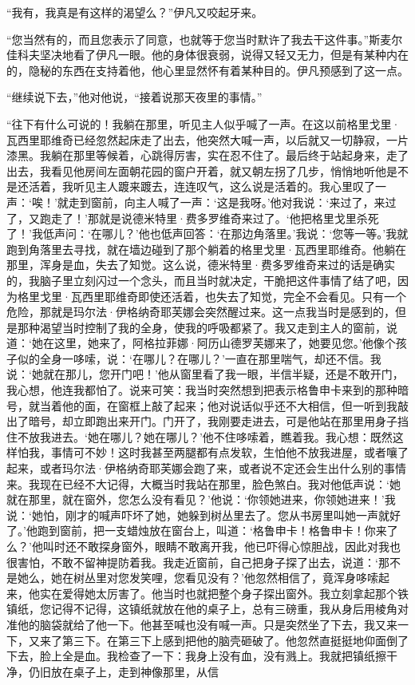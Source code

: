 \par “我有，我真是有这样的渴望么？”伊凡又咬起牙来。
\par “您当然有的，而且您表示了同意，也就等于您当时默许了我去干这件事。”斯麦尔佳科夫坚决地看了伊凡一眼。他的身体很衰弱，说得又轻又无力，但是有某种内在的，隐秘的东西在支持着他，他心里显然怀有着某种目的。伊凡预感到了这一点。
\par “继续说下去，”他对他说，“接着说那天夜里的事情。”
\par “往下有什么可说的！我躺在那里，听见主人似乎喊了一声。在这以前格里戈里·瓦西里耶维奇已经忽然起床走了出去，他突然大喊一声，以后就又一切静寂，一片漆黑。我躺在那里等候着，心跳得厉害，实在忍不住了。最后终于站起身来，走了出去，我看见他房间左面朝花园的窗户开着，就又朝左拐了几步，悄悄地听他是不是还活着，我听见主人踱来踱去，连连叹气，这么说是活着的。我心里叹了一声：‘唉！’就走到窗前，向主人喊了一声：‘这是我呀。’他对我说：‘来过了，来过了，又跑走了！’那就是说德米特里·费多罗维奇来过了。‘他把格里戈里杀死了！’我低声问：‘在哪儿？’他也低声回答：‘在那边角落里。’我说：‘您等一等。’我就跑到角落里去寻找，就在墙边碰到了那个躺着的格里戈里·瓦西里耶维奇。他躺在那里，浑身是血，失去了知觉。这么说，德米特里·费多罗维奇来过的话是确实的，我脑子里立刻闪过一个念头，而且当时就决定，干脆把这件事情了结了吧，因为格里戈里·瓦西里耶维奇即使还活着，也失去了知觉，完全不会看见。只有一个危险，那就是玛尔法·伊格纳奇耶芙娜会突然醒过来。这一点我当时是感到的，但是那种渴望当时控制了我的全身，使我的呼吸都紧了。我又走到主人的窗前，说道：‘她在这里，她来了，阿格拉菲娜·阿历山德罗芙娜来了，她要见您。’他像个孩子似的全身一哆嗦，说：‘在哪儿？在哪儿？’一直在那里喘气，却还不信。我说：‘她就在那儿，您开门吧！’他从窗里看了我一眼，半信半疑，还是不敢开门，我心想，他连我都怕了。说来可笑：我当时突然想到把表示格鲁申卡来到的那种暗号，就当着他的面，在窗框上敲了起来；他对说话似乎还不大相信，但一听到我敲出了暗号，却立即跑出来开门。门开了，我刚要走进去，可是他站在那里用身子挡住不放我进去。‘她在哪儿？她在哪儿？’他不住哆嗦着，瞧着我。我心想：既然这样怕我，事情可不妙！这时我甚至两腿都有点发软，生怕他不放我进屋，或者嚷了起来，或者玛尔法·伊格纳奇耶芙娜会跑了来，或者说不定还会生出什么别的事情来。我现在已经不大记得，大概当时我站在那里，脸色煞白。我对他低声说：‘她就在那里，就在窗外，您怎么没有看见？’他说：‘你领她进来，你领她进来！’我说：‘她怕，刚才的喊声吓坏了她，她躲到树丛里去了。您从书房里叫她一声就好了。’他跑到窗前，把一支蜡烛放在窗台上，叫道：‘格鲁申卡！格鲁申卡！你来了么？’他叫时还不敢探身窗外，眼睛不敢离开我，他已吓得心惊胆战，因此对我也很害怕，不敢不留神提防着我。我走近窗前，自己把身子探了出去，说道：‘那不是她么，她在树丛里对您发笑哩，您看见没有？’他忽然相信了，竟浑身哆嗦起来，他实在爱得她太厉害了。他当时也就把整个身子探出窗外。我立刻拿起那个铁镇纸，您记得不记得，这镇纸就放在他的桌子上，总有三磅重，我从身后用棱角对准他的脑袋就给了他一下。他甚至喊也没有喊一声。只是突然坐了下去，我又来一下，又来了第三下。在第三下上感到把他的脑壳砸破了。他忽然直挺挺地仰面倒了下去，脸上全是血。我检查了一下：我身上没有血，没有溅上。我就把镇纸擦干净，仍旧放在桌子上，走到神像那里，从信